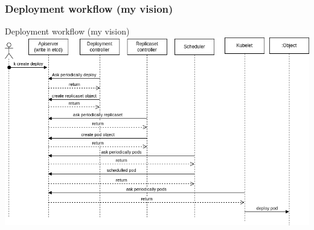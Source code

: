 \subsubsection{Deployment workflow (my vision)}
\begin{frame}{Deployment workflow (my vision)}
  \includegraphics[width=1\linewidth]{assets/k8s-deploy-creation-drawio.png}
\end{frame}
